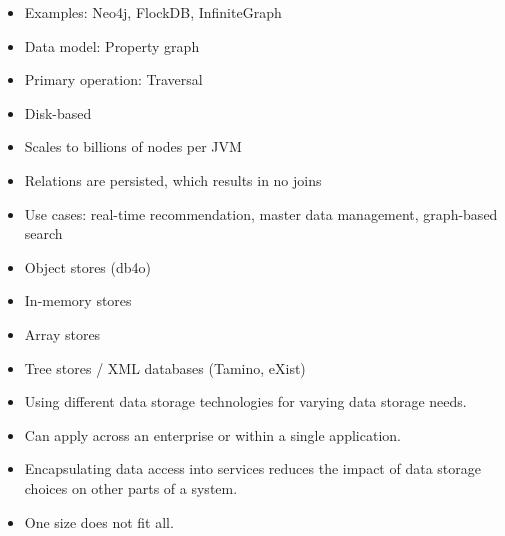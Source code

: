 \begin{breakbox}
\begin{itemize}
	\item Examples: Neo4j, FlockDB, InfiniteGraph
\end{itemize}
\end{breakbox}

\begin{breakbox}
\begin{itemize}
	\item Data model: Property graph
	\item Primary operation: Traversal
	\item Disk-based
	\item Scales to billions of nodes per JVM
	\item Relations are persisted, which results in no joins
\end{itemize}

\begin{itemize}
	\item Use cases: real-time recommendation, master data management, graph-based search
\end{itemize}
\end{breakbox}

\begin{breakbox}
\begin{itemize}
	\item Object stores (db4o)
	\item In-memory stores
	\item Array stores
	\item Tree stores / XML databases (Tamino, eXist)
\end{itemize}
\end{breakbox}

\begin{breakbox}
\begin{itemize}
	\item Using different data storage technologies for varying data storage needs.
	\item Can apply across an enterprise or within a single application.
	\item Encapsulating data access into services reduces the impact of data storage choices on other parts of a system.
	\item One size does not fit all.
\end{itemize}
\end{breakbox}


